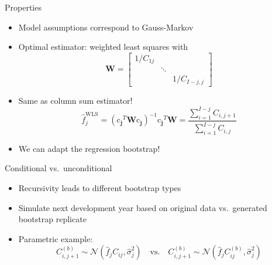 \documentclass[tikz]{beamer}
\begin{document}
\begin{frame}{Properties}
    \begin{itemize}
        \item Model assumptions correspond to Gauss-Markov
        \item Optimal estimator: weighted least squares with
              \begin{equation*}
                  \mathbf{W} =
                  \begin{bmatrix}
                      1 / C_{1j} &        &                  \\
                                 & \ddots &                  \\
                                 &        & 1 / C_{I - j, j}
                  \end{bmatrix}
              \end{equation*}
        \item Same as column sum estimator!
              \begin{equation*}
                  \widehat{f}^{\mathrm{WLS}}_j = (\bm{\mathrm{c}_j}^T \mathbf{W} \bm{\mathrm{c}_j})^{-1} \bm{\mathrm{c}_j}^T \mathbf{W} = \frac{\sum_{i = 1}^{I - j} C_{i, j + 1}}{\sum_{i = 1}^{I - j} C_{i, j}}
              \end{equation*}
        \item We can adapt the regression bootstrap!
    \end{itemize}
\end{frame}

\begin{frame}{Conditional vs.\ unconditional}
    \begin{itemize}
        \item Recursivity leads to different bootstrap types
        \item Simulate next development year based on original data vs.\ generated bootstrap replicate
        \item Parametric example:
              \begin{equation*}
                  C^{(b)}_{i, j + 1} \sim \mathcal{N}(\widehat{f}_j C_{ij}, \widehat{\sigma}^2_j) \quad \text{vs.} \quad C^{(b)}_{i, j + 1} \sim \mathcal{N}(\widehat{f}_j C^{(b)}_{ij}, \widehat{\sigma}^2_j)
              \end{equation*}
    \end{itemize}
\end{frame}
\end{document}
